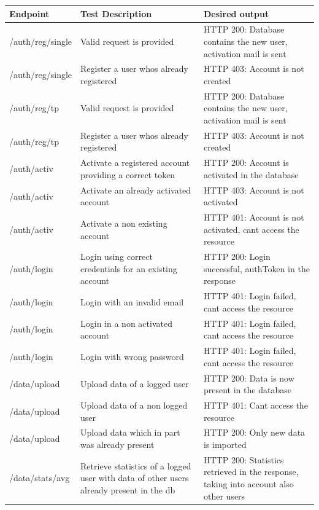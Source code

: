 \documentclass[titlepage]{article}
\begin{document}
	
	\renewcommand*{\arraystretch}{1.4}
	\begin{longtable}{| p{3 cm} | p{4 cm} | p{4 cm} |} \hline
		{\bf Endpoint} & {\bf Test Description} & {\bf Desired output} \\ \hline
		/auth/reg/single & Valid request is provided & HTTP 200: Database contains the new user, activation mail is sent \\ \hline
		/auth/reg/single & Register a user who\textsc{\char13}s already registered & HTTP 403: Account is not created \\ \hline
		/auth/reg/tp & Valid request is provided & HTTP 200: Database contains the new user, activation mail is sent \\ \hline
		/auth/reg/tp & Register a user who\textsc{\char13}s already registered & HTTP 403: Account is not created \\ \hline
		/auth/activ & Activate a registered account providing a correct token & HTTP 200: Account is activated in the database \\ \hline
		/auth/activ & Activate an already activated account & HTTP 403: Account is not activated \\ \hline
		/auth/activ & Activate a non existing account & HTTP 401: Account is not activated, can\textsc{\char13}t access the resource \\ \hline
		/auth/login & Login using correct credentials for an existing account & HTTP 200: Login successful, authToken in the response \\ \hline
		/auth/login & Login with an invalid email & HTTP 401: Login failed, can\textsc{\char13}t access the resource \\ \hline
		/auth/login & Login in a non activated account & HTTP 401: Login failed, can\textsc{\char13}t access the resource \\ \hline
		/auth/login & Login with wrong password & HTTP 401: Login failed, can\textsc{\char13}t access the resource \\ \hline
		/data/upload & Upload data of a logged user & HTTP 200: Data is now present in the database \\ \hline
		/data/upload & Upload data of a non logged user & HTTP 401: Can\textsc{\char13}t access the resource \\ \hline
		/data/upload & Upload data which in part was already present & HTTP 200: Only new data is imported \\ \hline
		/data/stats/avg & Retrieve statistics of a logged user with data of other users already present in the db & HTTP 200: Statistics retrieved in the response, taking into account also other users \\ \hline

\end{longtable}
\end{document}
